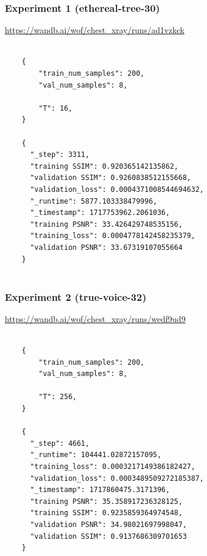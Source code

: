 \documentclass[12pt]{article}
\begin{document}
\subsubsection{Experiment 1 (ethereal-tree-30)}

    \url{https://wandb.ai/wof/chest_xray/runs/ad1vzkck}

    \begin{verbatim}
    
    {
        "train_num_samples": 200,
        "val_num_samples": 8,
    
        "T": 16,
    }
    
    {
      "_step": 3311,
      "training SSIM": 0.920365142135862,
      "validation SSIM": 0.9260838512155668,
      "validation_loss": 0.0004371008544694632,
      "_runtime": 5877.103338479996,
      "_timestamp": 1717753962.2061036,
      "training PSNR": 33.426429748535156,
      "training_loss": 0.0004778142458235379,
      "validation PSNR": 33.67319107055664
    }
    
    \end{verbatim}

\subsubsection{Experiment 2 (true-voice-32)}

    \url{https://wandb.ai/wof/chest_xray/runs/wedf9ud9}

    \begin{verbatim}
    
    {
        "train_num_samples": 200,
        "val_num_samples": 8,
    
        "T": 256,
    }
    
    {
      "_step": 4661,
      "_runtime": 104441.02872157095,
      "training_loss": 0.0003217149386182427,
      "validation_loss": 0.0003489509272185387,
      "_timestamp": 1717860475.3171396,
      "training PSNR": 35.358917236328125,
      "training SSIM": 0.9235859364974548,
      "validation PSNR": 34.98021697998047,
      "validation SSIM": 0.9137686309701653
    }
        
    \end{verbatim}
\end{document}
